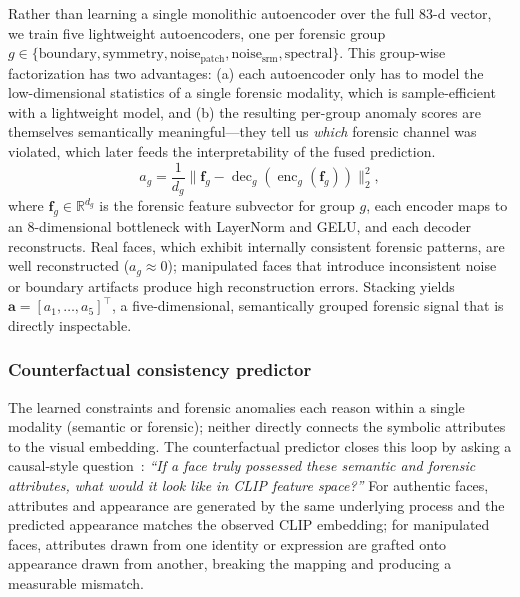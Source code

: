 \documentclass{article}
\begin{document}
Rather than learning a single monolithic autoencoder over the full 83-d vector, we train five lightweight autoencoders, one per forensic group $g \in \{\text{boundary}, \text{symmetry}, \text{noise}_\text{patch}, \text{noise}_\text{srm}, \text{spectral}\}$. This group-wise factorization has two advantages: (a) each autoencoder only has to model the low-dimensional statistics of a single forensic modality, which is sample-efficient with a lightweight model, and (b) the resulting per-group anomaly scores are themselves semantically meaningful---they tell us \emph{which} forensic channel was violated, which later feeds the interpretability of the fused prediction.
\begin{equation}
  a_g = \frac{1}{d_g}\bigl\|\bm{f}_g - \operatorname{dec}_g(\operatorname{enc}_g(\bm{f}_g))\bigr\|_2^2,
  \label{eq:anomaly}
\end{equation}
where $\bm{f}_g \in \mathbb{R}^{d_g}$ is the forensic feature subvector for group $g$, each encoder maps to an 8-dimensional bottleneck with LayerNorm and GELU, and each decoder reconstructs. Real faces, which exhibit internally consistent forensic patterns, are well reconstructed ($a_g \approx 0$); manipulated faces that introduce inconsistent noise or boundary artifacts produce high reconstruction errors. Stacking yields $\bm{a} = [a_1, \ldots, a_5]^\top$, a five-dimensional, semantically grouped forensic signal that is directly inspectable.


\subsubsection{Counterfactual consistency predictor}
\label{sec:counterfactual}

The learned constraints and forensic anomalies each reason within a single modality (semantic or forensic); neither directly connects the symbolic attributes to the visual embedding. The counterfactual predictor closes this loop by asking a causal-style question~\citep{scholkopf2021toward,pearl2009causality}: \emph{``If a face truly possessed these semantic and forensic attributes, what would it look like in CLIP feature space?''} For authentic faces, attributes and appearance are generated by the same underlying process and the predicted appearance matches the observed CLIP embedding; for manipulated faces, attributes drawn from one identity or expression are grafted onto appearance drawn from another, breaking the mapping and producing a measurable mismatch.
\end{document}
